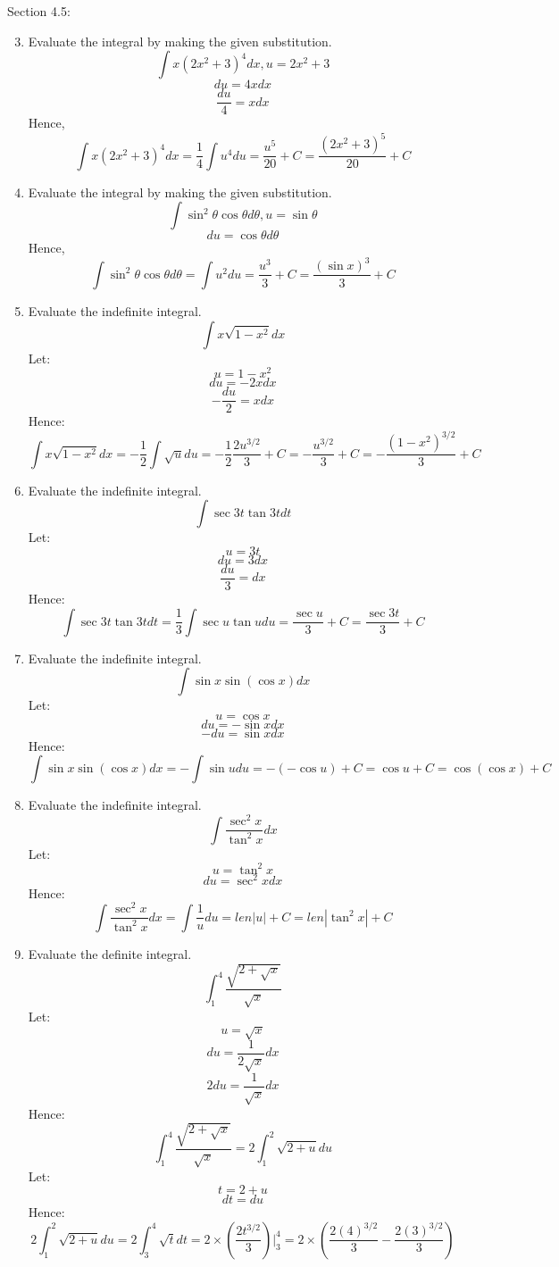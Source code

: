 \documentclass[12pt]{article}
\begin{document}
\newpage 
Section 4.5:

\begin{enumerate}
\setcounter{enumi}{2}
    \item Evaluate the integral by making the given substitution.
    \[\int x(2x^2 + 3)^4 dx, u = 2x^2 + 3\]
    \[du = 4x dx\]
    \[\frac{du}{4} = x dx\]
    Hence,
    \[\int x(2x^2 + 3)^4dx = \frac{1}{4}\int u^4 du = \frac{u^5}{20} + C = \frac{(2x^2 + 3)^5}{20} + C\]
    \item Evaluate the integral by making the given substitution.
    \[\int \sin^2 \theta \cos \theta d\theta, u = \sin \theta\]
    \[du = \cos \theta d\theta\]
    Hence, 
    \[\int \sin^2 \theta \cos \theta d\theta = \int u^2 du = \frac{u^3}{3} + C = \frac{(\sin x)^3}{3} + C\]
\setcounter{enumi}{8}
    \item Evaluate the indefinite integral.
    \[\int x \sqrt{1-x^2}dx\]
    Let:
    \[u = 1 - x^2\]
    \[du =- 2xdx\]
    \[-\frac{du}{2} = xdx\]
    Hence:
    \[\int x \sqrt{1-x^2}dx = -\frac{1}{2}\int \sqrt{u}du = -\frac{1}{2} \frac{2u^{3/2}}{3} + C = -\frac{u^{3/2}}{3} + C = -\frac{(1-x^2)^{3/2}}{3} + C\]
\setcounter{enumi}{14}
    \item Evaluate the indefinite integral.
    \[\int \sec 3t \tan 3t dt\]
    Let:
    \[u = 3t\]
    \[du = 3dx\]
    \[\frac{du}{3} = dx\]
    Hence:
    \[\int \sec 3t \tan 3t dt = \frac{1}{3} \int \sec u \tan u du = \frac{\sec u}{3} + C = \frac{\sec 3t}{3} + C \]
\setcounter{enumi}{19}
    \item Evaluate the indefinite integral.
    \[\int \sin x \sin (\cos x) dx\]
    Let:
    \[u = \cos x\]
    \[du = - \sin x dx\]
    \[-du = \sin x dx\]
    Hence:
    \[\int \sin x \sin (\cos x) dx = - \int \sin u du = - (-\cos u) + C = \cos u + C = \cos (\cos x) + C\]
\setcounter{enumi}{23}
    \item Evaluate the indefinite integral.
    \[\int \frac{\sec^2 x}{\tan^2 x}dx\]
    Let:
    \[u = \tan^2 x\]
    \[du = \sec^2x dx\]
    Hence: 
    \[\int \frac{\sec^2 x}{\tan^2 x}dx = \int \frac{1}{u} du = len{|u|} + C = len{|\tan^2 x|} + C\]
\setcounter{enumi}{41}
    \item Evaluate the definite integral.
    \[\int_{1}^{4} \frac{\sqrt{2+\sqrt{x}}}{\sqrt{x}}\]
    Let:
    \[u = \sqrt{x}\]
    \[du = \frac{1}{2\sqrt{x}}dx\]
    \[2du = \frac{1}{\sqrt{x}}dx\]
    Hence:
    \[\int_{1}^{4} \frac{\sqrt{2+\sqrt{x}}}{\sqrt{x}} = 2\int_{1}^{2} \sqrt{2 + u}du\]
    Let:
    \[t = 2 + u\]
    \[dt = du\]
    Hence:
    \[2\int_{1}^{2} \sqrt{2 + u}du = 2\int_{3}^{4} \sqrt{t}dt = 2 \times (\frac{2t^{3/2}}{3})|^{4}_{3} = 2 \times (\frac{2(4)^{3/2}}{3} - \frac{2(3)^{3/2}}{3})\]

\end{enumerate}
\end{document}
